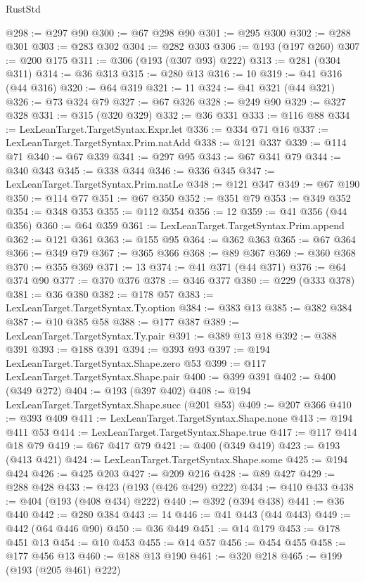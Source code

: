 \begin{lexlean}{RustStd}
\begin{coremodule}
@298 := @297 @90
@300 := @67 @298 @90
@301 := @295 @300
@302 := @288 @301
@303 := @283 @302
@304 := @282 @303
@306 := @193 (@197 @260)
@307 := @200 @175
@311 := @306 (@193 (@307 @93) @222)
@313 := @281 (@304 @311)
@314 := @36 @313
@315 := @280 @13
@316 := 10
@319 := @41 @316 (@44 @316)
@320 := @64 @319
@321 := 11
@324 := @41 @321 (@44 @321)
@326 := @73 @324 @79
@327 := @67 @326
@328 := @249 @90
@329 := @327 @328
@331 := @315 (@320 @329)
@332 := @36 @331
@333 := @116 @88
@334 := LexLeanTarget.TargetSyntax.Expr.let
@336 := @334 @71 @16
@337 := LexLeanTarget.TargetSyntax.Prim.natAdd
@338 := @121 @337
@339 := @114 @71
@340 := @67 @339
@341 := @297 @95
@343 := @67 @341 @79
@344 := @340 @343
@345 := @338 @344
@346 := @336 @345
@347 := LexLeanTarget.TargetSyntax.Prim.natLe
@348 := @121 @347
@349 := @67 @190
@350 := @114 @77
@351 := @67 @350
@352 := @351 @79
@353 := @349 @352
@354 := @348 @353
@355 := @112 @354
@356 := 12
@359 := @41 @356 (@44 @356)
@360 := @64 @359
@361 := LexLeanTarget.TargetSyntax.Prim.append
@362 := @121 @361
@363 := @155 @95
@364 := @362 @363
@365 := @67 @364
@366 := @349 @79
@367 := @365 @366
@368 := @89 @367
@369 := @360 @368
@370 := @355 @369
@371 := 13
@374 := @41 @371 (@44 @371)
@376 := @64 @374 @90
@377 := @370 @376
@378 := @346 @377
@380 := @229 (@333 @378)
@381 := @36 @380
@382 := @178 @57
@383 := LexLeanTarget.TargetSyntax.Ty.option
@384 := @383 @13
@385 := @382 @384
@387 := @10 @385 @58
@388 := @177 @387
@389 := LexLeanTarget.TargetSyntax.Ty.pair
@391 := @389 @13 @18
@392 := @388 @391
@393 := @188 @391
@394 := @393 @93
@397 := @194 LexLeanTarget.TargetSyntax.Shape.zero @53
@399 := @117 LexLeanTarget.TargetSyntax.Shape.pair
@400 := @399 @391
@402 := @400 (@349 @272)
@404 := @193 (@397 @402)
@408 := @194 LexLeanTarget.TargetSyntax.Shape.succ (@201 @53)
@409 := @207 @366
@410 := @393 @409
@411 := LexLeanTarget.TargetSyntax.Shape.none
@413 := @194 @411 @53
@414 := LexLeanTarget.TargetSyntax.Shape.true
@417 := @117 @414 @18 @79
@419 := @67 @417 @79
@421 := @400 (@349 @419)
@423 := @193 (@413 @421)
@424 := LexLeanTarget.TargetSyntax.Shape.some
@425 := @194 @424
@426 := @425 @203
@427 := @209 @216
@428 := @89 @427
@429 := @288 @428
@433 := @423 (@193 (@426 @429) @222)
@434 := @410 @433
@438 := @404 (@193 (@408 @434) @222)
@440 := @392 (@394 @438)
@441 := @36 @440
@442 := @280 @384
@443 := 14
@446 := @41 @443 (@44 @443)
@449 := @442 (@64 @446 @90)
@450 := @36 @449
@451 := @14 @179
@453 := @178 @451 @13
@454 := @10 @453
@455 := @14 @57
@456 := @454 @455
@458 := @177 @456 @13
@460 := @188 @13 @190
@461 := @320 @218
@465 := @199 (@193 (@205 @461) @222)

\end{coremodule}
\end{lexlean}
